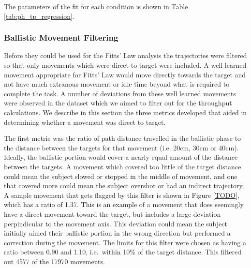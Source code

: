 The parameters of the fit for each condition is shown in Table \ref{tab:ph_tp_regression}.


\subsubsection{Ballistic Movement Filtering}

Before they could be used for the Fitts' Law analysis the trajectories were filtered so that only movements which were direct to target were included.
A well-learned movement appropriate for Fitts' Law would move directly towards the target and not have much extranous movement or idle time beyond what is required to complete the task.
A number of deviations from these well learned movements were observed in the dataset which we aimed to filter out for the throughput calculations.
We describe in this section the three metrics developed that aided in determining whether a movement was direct to target.


The first metric was the ratio of path distance travelled in the ballistic phase to the distance between the targets for that movement (i.e. 20cm, 30cm or 40cm).
Ideally, the ballistic portion would cover a nearly equal amount of the distance between the targets.
A movement which covered too little of the target distance could mean the subject slowed or stopped in the middle of movement, and one that covered more could mean the subject overshot or had an indirect trajectory.
A sample movement that gets flagged by this filter is shown in Figure \ref{TODO}, which has a ratio of 1.37.
This is an example of a movement that does seemingly have a direct movement toward the target, but includes a large deviation perpindicular to the movement axis.
This deviation could mean the subject initially aimed their ballistic portion in the wrong direction but performed a correction during the movement.
The limits for this filter were chosen as having a ratio between 0.90 and 1.10, i.e.\ within 10\% of the target distance.
This filtered out 4577 of the 17970 movements.

